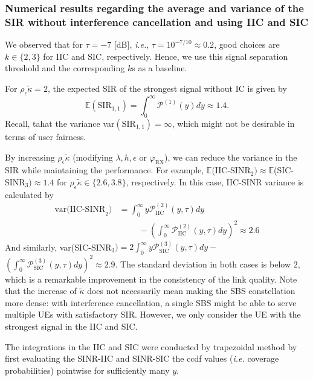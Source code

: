 \documentclass[lettersize,journal]{IEEEtran}
\begin{document}
\subsubsection{Numerical results regarding the average and variance of the SIR without interference cancellation and using IIC and SIC}
We observed that for $\tau = -7$ [dB], \textit{ i.e.}, $\tau =10^{-7/10}\approx 0.2$, good choices are $k \in\{2,3\}$ for IIC and SIC, respectively. Hence, we use this signal separation threshold and the corresponding $k$s as a baseline.

For $\rho_{\epsilon} \tilde{\kappa}=2$, the expected SIR of the strongest signal without IC is given by
\begin{equation}
  \mathbb{E}(\text{SIR}_{1,1})= \int_{0}^{\infty}\mathcal{P}^{(1)}(y)dy \approx 1.4.
\end{equation}
  Recall, tahat the variance var$(\text{SIR}_{1,1})=\infty$, which might not be desirable in terms of user fairness.

  By increasing $\rho_{\epsilon} \tilde{\kappa}$ (modifying $\lambda,h,\epsilon$ or $\varphi_{\text{RX}}$), we can reduce the variance in the SIR while maintaining the performance. For example, $ \mathbb{E}$(IIC-SINR$_{2}) \approx \mathbb{E}$(SIC-SINR$_{3}) \approx 1.4$ for $\rho_{\epsilon} \tilde{\kappa}\in \{2.6,3.8\}$, respectively. In this case, IIC-SINR variance is calculated by
\begin{align}
  \text{var(IIC-SINR}_{2})&=\int_{0}^{\infty}y\mathcal{P}_{\text{IIC}}^{(2)}(y,\tau)dy \nonumber \\
  &\hspace{1cm}-\left(\int_{0}^{\infty}\mathcal{P}_{\text{IIC}}^{(2)}(y,\tau)dy\right)^2  \approx 2.6
\end{align}
And similarly, var(SIC-SINR$_{3}) = 2\int_{0}^{\infty}y\mathcal{P}_{\text{SIC}}^{(3)}(y,\tau)dy-$ $\left(\int_{0}^{\infty}\mathcal{P}_{\text{SIC}}^{(3)}(y,\tau)dy\right)^2 \approx 2.9$. The standard deviation in both cases is below $2$, which is a remarkable improvement in the consistency of the link quality. Note that the increase of $\tilde{\kappa}$ does not necessarily mean making the SBS constellation more dense: with interference cancellation, a single SBS might be able to serve multiple UEs with satisfactory SIR. However, we only consider the UE with the strongest signal in the IIC and SIC.

The integrations in the IIC and SIC were conducted by trapezoidal method by first evaluating the SINR-IIC and SINR-SIC the ccdf values (\textit{i.e.} coverage probabilities) pointwise for sufficiently many $y$.
\end{document}
